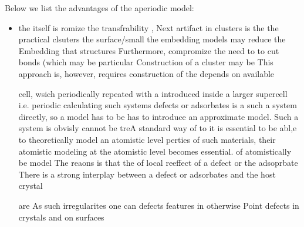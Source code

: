 \documentclass[a4paper,11pt,headings=normal]{scrartcl}
\begin{document}
Below we list the advantages of the aperiodic model:
\begin{itemize}
  \item



the itself is romize the transfrability ,  Next artifact in clusters is the the practical clsuters the surface/small  the embedding models may reduce the  Embedding that   structures Furthermore, compromize the   need to to cut bonds (which may be particular Construction of a cluster may be This approach is, however, requires construction of the depends on available 

cell, wsich periodically repeated with a introduced inside a larger supercell  i.e. periodic    calculating such systems  defects or adsorbates is a  such a system directly, so a model has to be  has to introduce an approximate model.  Such a system is obvisly cannot be treA standard way of   to it is essential to be abl,e to theoretically model an atomistic level perties of such materials, their atomistic modeling at the atomistic level becomes essential. of  atomistically be model      The reaons is that the  of      local reeffect of a defect or the adsoprbate  There is a strong interplay between a defect or adsorbates and the host crystal 



are   As such irregularites one can defects      features in otherwise Point defects in crystals and on surfaces  



\end{itemize}
\end{document}
